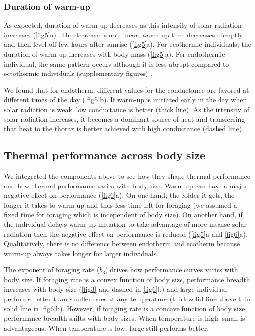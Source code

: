 \subsubsection*{Duration of warm-up}
As expected, duration of warm-up decreases as this intensity of solar radiation increases (\cref{fig5}a).
The decrease is not linear, warm-up time decreases abruptly and then level off few hours after sunrise (\cref{fig5}a).
For ecothermic individuals, the duration of warm-up increases with body mass (\cref{fig5}a).
For endothermic individual, the same pattern occurs although it is less abrupt compared to ectothermic individuals (supplementary figures) .

We found that for endotherm, different values for the conductance are favored at different times of the day (\cref{fig5}b).
If warm-up is initiated early in the day when solar radiation is weak, low conductance is better (thick line).
As the intensity of solar radiation increases, it becomes a dominant source of heat and transferring that heat to the thorax is better achieved with high conductance (dashed line).

\subsection*{Thermal performance across body size}
 We integrated the components above to see how they shape thermal performance and how thermal performance varies with body size.
Warm-up can have a major negative effect on performance (\cref{fig6}a).
On one hand, the colder it gets, the longer it takes to warm-up and thus less time left for foraging (we assumed a fixed time for foraging which is independent of body size).
On another hand, if the individual delays warm-up initiation to take advantage of more intense solar radiation then the negative effect on performance is reduced (\cref{fig5}a and \cref{fig6}a).
Qualitatively, there is no difference between endotherm and ecotherm because warm-up always takes longer for larger individuals. 

The exponent of foraging rate ($b_3$) drives how performance curves varies with body size.
If foraging rate is a convex function of body size, performance breadth increases with body size (\cref{fig3} and dashed in \cref{fig6}b) and  large individual performs better than smaller ones at any temperature (thick solid line above thin solid line in \cref{fig6}b).
However, if foraging rate is a concave function of body size, performance breadth shifts with body sizes.
When temperature is high, small is advantageous.
When temperature  is low, large still performs better.
   
